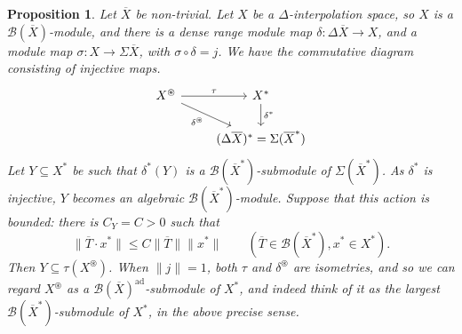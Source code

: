 \documentclass[a4paper,11pt]{article}
\theoremstyle{plain}
\newtheorem{proposition}{Proposition}[section]
\theoremstyle{remark}
\newcommand{\mc}[1]{\mathcal{#1}}
\newcommand{\intdual}{\circledast}
\newcommand{\ad}{{\operatorname{ad}}}
\begin{document}
\begin{proposition}\label{prop:intdual_biggest_submod}
Let $\overline X$ be non-trivial.
Let $X$ be a $\Delta$-interpolation space, so $X$ is a $\mc B(\overline X)$-module, and there is a dense range module map $\delta \colon \Delta\overline X \to X$, and a module map $\sigma\colon X \to \Sigma\overline X$, with $\sigma\circ\delta = j$.  We have the commutative diagram consisting of injective maps.
\[\begin{tikzcd}
  X^\intdual \arrow[r, "\tau"] \arrow[rd, "\delta^\intdual"'] & X^* \arrow[d, "\delta^*"] \\
  & (\Delta\overline X)^* = \Sigma(\overline X^*)
\end{tikzcd}\]
Let $Y\subseteq X^*$ be such that $\delta^*(Y)$ is a $\mc B(\overline X^*)$-submodule of $\Sigma(\overline X^*)$.  As $\delta^*$ is injective, $Y$ becomes an algebraic $\mc B(\overline X^*)$-module.  Suppose that this action is bounded: there is $C_Y = C>0$ such that
\[ \|\overline T\cdot x^*\| \leq C \|\overline T\| \|x^*\| \qquad (\overline T\in\mc B(\overline X^*), x^*\in X^*). \]
Then $Y\subseteq \tau(X^\intdual)$.  When $\|j\|=1$, both $\tau$ and $\delta^\intdual$ are isometries, and so we can regard $X^\intdual$ as a $\mc B(\overline X)^\ad$-submodule of $X^*$, and indeed think of it as the largest $\mc B(\overline X^*)$-submodule of $X^*$, in the above precise sense.
\end{proposition}
\end{document}
